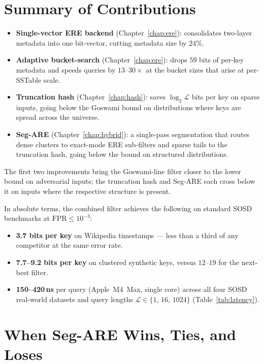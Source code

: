 \section{Summary of Contributions}
\label{sec:conclusion-summary}

\begin{itemize}
    \item \textbf{Single-vector ERE backend} (Chapter~\ref{chap:ere}):
    consolidates two-layer metadata into one bit-vector, cutting metadata
    size by $24\%$.
    \item \textbf{Adaptive bucket-search} (Chapter~\ref{chap:ere}):
    drops $59$ bits of per-key metadata and speeds queries by
    $13$--$30\times$ at the bucket sizes that arise at per-SSTable scale.
    \item \textbf{Truncation hash} (Chapter~\ref{chap:hash}):
    saves $\log_2 \mathcal{L}$ bits per key on sparse inputs,
    going below the Goswami bound on distributions where keys are spread
    across the universe.
    \item \textbf{Seg-ARE} (Chapter~\ref{chap:hybrid}):
    a single-pass segmentation that routes dense clusters to exact-mode
    ERE sub-filters and sparse tails to the truncation hash, going below
    the bound on structured distributions.
\end{itemize}
The first two improvements bring the Goswami-line filter closer to the
lower bound on adversarial inputs; the truncation hash and Seg-ARE each
cross below it on inputs where the respective structure is present.

In absolute terms, the combined filter achieves the following on
standard SOSD benchmarks at $\mathrm{FPR} \leq 10^{-3}$:

\begin{itemize}
    \item \textbf{3.7 bits per key} on Wikipedia timestamps --- less
    than a third of any competitor at the same error rate.
    \item \textbf{7.7--9.2 bits per key} on clustered synthetic keys,
    versus $12$--$19$ for the next-best filter.
    \item \textbf{150--420\,ns} per query (Apple~M4~Max, single core)
    across all four SOSD real-world datasets and query lengths
    $\mathcal{L} \in \{1,\,16,\,1024\}$
    (Table~\ref{tab:latency}).
\end{itemize}

\section{When Seg-ARE Wins, Ties, and Loses}
\label{sec:conclusion-where}

